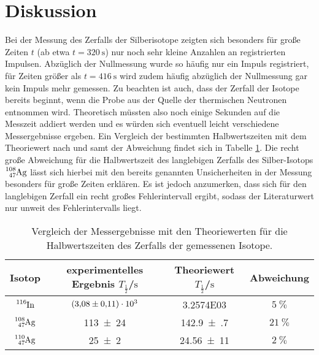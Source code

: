 \section{Diskussion}
\label{sec:Diskussion}
Bei der Messung des Zerfalls der Silberisotope zeigten sich besonders für große Zeiten $t$ (ab etwa $t=\SI{320}{\second}$) nur noch sehr kleine Anzahlen an registrierten Impulsen. Abzüglich der Nullmessung wurde so häufig nur ein Impuls registriert, für Zeiten größer als $t=\SI{416}{\second}$ wird zudem häufig abzüglich der Nullmessung gar kein Impuls mehr gemessen.
Zu beachten ist auch, dass der Zerfall der Isotope bereits beginnt, wenn die Probe aus der Quelle der thermischen Neutronen entnommen wird.
Theoretisch müssten also noch einige Sekunden auf die Messzeit addiert werden und es würden sich eventuell leicht verschiedene Messergebnisse ergeben.
Ein Vergleich der bestimmten Halbwertszeiten mit dem Theoriewert nach \cite{silber} und
\cite{indium} samt der Abweichung findet sich in Tabelle \ref{tab:theor}. Die recht große Abweichung für die Halbwertszeit des langlebigen Zerfalls des Silber-Isotops $\ce{^{108}_47Ag}$ lässt sich hierbei mit den bereits genannten Unsicherheiten in der Messung besonders für große Zeiten erklären.
Es ist jedoch anzumerken, dass sich für den langlebigen Zerfall ein recht großes Fehlerintervall ergibt, sodass der Literaturwert nur unweit des Fehlerintervalls liegt.
\begin{table}
  \centering
  \caption{Vergleich der Messergebnisse mit den Theoriewerten für die Halbwertszeiten des Zerfalls der gemessenen Isotope.}
  \label{tab:theor}
  \begin{tabular}{cccc}
  \toprule
  Isotop&experimentelles Ergebnis $T_\frac{1}{2}$/$\si{\second}$&Theoriewert $T_\frac{1}{2}$/$\si{\second}$ &Abweichung\\
  \midrule
	  $\ce{^{116}In}$&$\num{3.08(11)E03}$ & \num{3.2574E03} & $\SI{5}{\percent}$ \\
  $\ce{^{108}_47Ag}$&\num{113(24)}&\num{142.9(7)}&$\SI{21}{\percent}$\\
  $\ce{^{110}_47Ag}$&\num{25(2)}&\num{24,56(11)}&$\SI{2}{\percent}$\\
  \bottomrule
  \end{tabular}
\end{table}
